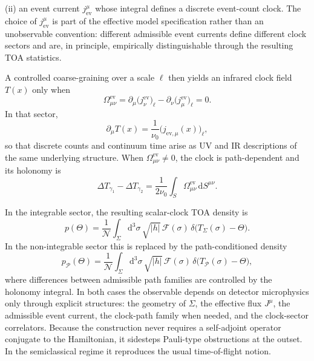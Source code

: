 \documentclass[11pt, a4paper]{article}
\theoremstyle{definition}
\theoremstyle{plain}
\theoremstyle{remark}
\numberwithin{equation}{section}
\newcommand{\dd}{\mathrm{d}}
\begin{document}
    \noindent
    (ii) an event current $j^\mu_{\mathrm{ev}}$ whose integral defines a discrete event-count clock. The choice of $j^\mu_{\mathrm{ev}}$ is part of the effective model specification rather than an unobservable convention: different admissible event currents define different clock sectors and are, in principle, empirically distinguishable through the resulting TOA statistics.
    
    \smallskip
    A controlled coarse-graining over a scale $\ell$ then yields an infrared clock field $T(x)$ only when
    \begin{equation}
        \Omega^{\mathrm{ev}}_{\mu\nu}
        =
        \partial_\mu\big(j^{\mathrm{ev}}_\nu\big)_\ell
        -
        \partial_\nu\big(j^{\mathrm{ev}}_\mu\big)_\ell
        =0 .
    \end{equation}
    In that sector,
    \begin{equation}
        \partial_\mu T(x)=\frac{1}{\nu_0}\big(j_{\mathrm{ev},\mu}(x)\big)_\ell,
    \end{equation}
    so that discrete counts and continuum time arise as UV and IR descriptions of the same underlying structure. When $\Omega^{\mathrm{ev}}_{\mu\nu}\neq0$, the clock is path-dependent and its holonomy is
    \begin{equation}
        \Delta T_{\gamma_1}-\Delta T_{\gamma_2}
        =
        \frac{1}{2\nu_0}
        \int_S
        \Omega^{\mathrm{ev}}_{\mu\nu}\,\dd S^{\mu\nu} .
    \end{equation}
    
    In the integrable sector, the resulting scalar-clock TOA density is
    \begin{equation}
        p(\Theta)=
        \frac{1}{\mathcal{N}}
        \int_{\Sigma}\dd^3\sigma\,\sqrt{|h|}\,
        \mathcal{F}(\sigma)\,
        \delta\!\big(T_\Sigma(\sigma)-\Theta\big).
    \end{equation}
    In the non-integrable sector this is replaced by the path-conditioned density
    \begin{equation}
        p_{\mathcal{P}}(\Theta)=
        \frac{1}{\mathcal{N}}
        \int_{\Sigma}\dd^3\sigma\,\sqrt{|h|}\,
        \mathcal{F}(\sigma)\,
        \delta\!\big(T_{\mathcal{P}}(\sigma)-\Theta\big),
    \end{equation}
    where differences between admissible path families are controlled by the holonomy integral. In both cases the observable depends on detector microphysics only through explicit structures: the geometry of $\Sigma$, the effective flux $J^\mu$, the admissible event current, the clock-path family when needed, and the clock-sector correlators. Because the construction never requires a self-adjoint operator conjugate to the Hamiltonian, it sidesteps Pauli-type obstructions at the outset. In the semiclassical regime it reproduces the usual time-of-flight notion.
\end{document}
